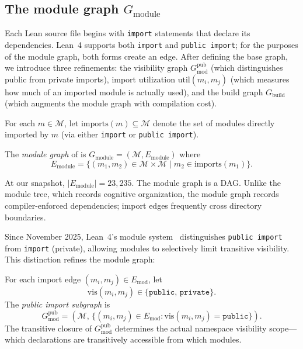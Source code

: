 \subsection{The module graph $G_{\mathrm{module}}$}
Each Lean source file begins with \texttt{import} statements that declare its dependencies. Lean~4 supports both \texttt{import} and \texttt{public import}; for the purposes of the module graph, both forms create an edge. After defining the base graph, we introduce three refinements: the visibility graph $G_{\mathrm{mod}}^{\mathrm{pub}}$ (which distinguishes public from private imports), import utilization $\mathrm{util}(m_i, m_j)$ (which measures how much of an imported module is actually used), and the build graph $G_{\mathrm{build}}$ (which augments the module graph with compilation cost).

\begin{definition}
\label{def:import-set}
For each $m \in \mathcal{M}$, let $\mathrm{imports}(m) \subseteq \mathcal{M}$ denote the set of modules directly imported by $m$ (via either \texttt{import} or \texttt{public import}).
\end{definition}

\begin{definition}\label{def:module-graph}
The \emph{module graph} of  is $G_{\mathrm{module}} = (\mathcal{M}, E_{\mathrm{module}})$ where
\[
  E_{\mathrm{module}} = \{(m_1, m_2) \in \mathcal{M} \times \mathcal{M} \mid m_2 \in \mathrm{imports}(m_1)\}.
\]
\end{definition}

\noindent At our snapshot, $|E_{\mathrm{module}}| = 23{,}235$. The module graph is a DAG. Unlike the module tree, which records cognitive organization, the module graph records compiler-enforced dependencies; import edges frequently cross directory boundaries.

Since November 2025, Lean~4's module system~\cite{lean4modules} distinguishes \texttt{public import} from \texttt{import} (private), allowing modules to selectively limit transitive visibility. This distinction refines the module graph:

\begin{definition}\label{def:visibility-graph}
For each import edge $(m_i, m_j) \in E_{\mathrm{mod}}$, let
\[
  \mathrm{vis}(m_i, m_j) \in \{\texttt{public},\, \texttt{private}\}.
\]
The \emph{public import subgraph} is
\[
  G_{\mathrm{mod}}^{\mathrm{pub}} = (\mathcal{M},\, \{(m_i, m_j) \in E_{\mathrm{mod}} : \mathrm{vis}(m_i, m_j) = \texttt{public}\}).
\]
The transitive closure of $G_{\mathrm{mod}}^{\mathrm{pub}}$ determines the actual namespace visibility scope---which declarations are transitively accessible from which modules.
\end{definition}

